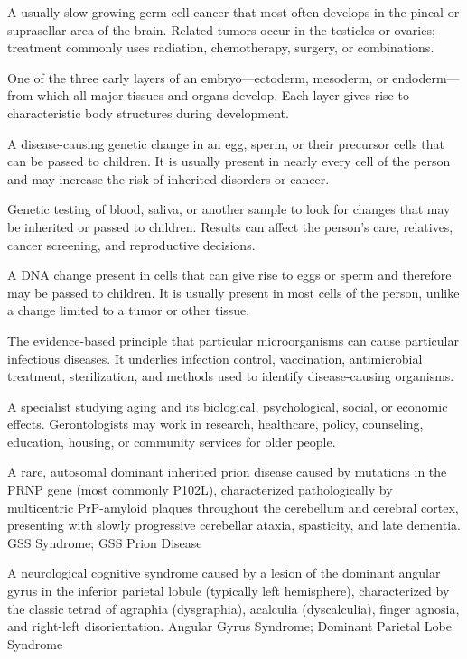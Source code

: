  A usually slow-growing germ-cell cancer that most often develops in the pineal or suprasellar area of the brain. Related tumors occur in the testicles or ovaries; treatment commonly uses radiation, chemotherapy, surgery, or combinations.

 One of the three early layers of an embryo—ectoderm, mesoderm, or endoderm—from which all major tissues and organs develop. Each layer gives rise to characteristic body structures during development.

 A disease-causing genetic change in an egg, sperm, or their precursor cells that can be passed to children. It is usually present in nearly every cell of the person and may increase the risk of inherited disorders or cancer.

 Genetic testing of blood, saliva, or another sample to look for changes that may be inherited or passed to children. Results can affect the person’s care, relatives, cancer screening, and reproductive decisions.

 A DNA change present in cells that can give rise to eggs or sperm and therefore may be passed to children. It is usually present in most cells of the person, unlike a change limited to a tumor or other tissue.

 The evidence-based principle that particular microorganisms can cause particular infectious diseases. It underlies infection control, vaccination, antimicrobial treatment, sterilization, and methods used to identify disease-causing organisms.

 A specialist studying aging and its biological, psychological, social, or economic effects. Gerontologists may work in research, healthcare, policy, counseling, education, housing, or community services for older people.

 A rare, autosomal dominant inherited prion disease caused by mutations in the PRNP gene (most commonly P102L), characterized pathologically by multicentric PrP-amyloid plaques throughout the cerebellum and cerebral cortex, presenting with slowly progressive cerebellar ataxia, spasticity, and late dementia.
\synonyms
GSS Syndrome; GSS Prion Disease

 A neurological cognitive syndrome caused by a lesion of the dominant angular gyrus in the inferior parietal lobule (typically left hemisphere), characterized by the classic tetrad of agraphia (dysgraphia), acalculia (dyscalculia), finger agnosia, and right-left disorientation.
\synonyms
Angular Gyrus Syndrome; Dominant Parietal Lobe Syndrome

